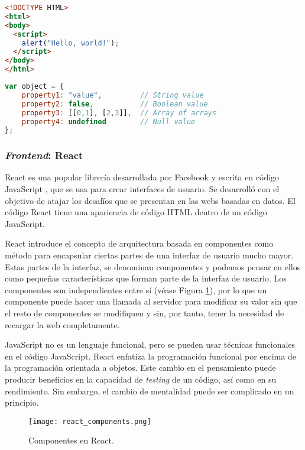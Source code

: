 \begin{lstlisting}[language=html,captionpos=t,caption={\textbf{\textit{Hello world} en JavaScript.}},label={lst:jsHelloWorld}]
<!DOCTYPE HTML>
<html>
<body>
  <script>
    alert("Hello, world!");
  </script>
</body>
</html>
\end{lstlisting}


\begin{lstlisting}[language=JavaScript,captionpos=t,caption={\textbf{Creación de un objeto en JavaScript.}},label={lst:jsObjects}]
var object = {
	property1: "value",         // String value
	property2: false,           // Boolean value
	property3: [[0,1], [2,3]],  // Array of arrays
	property4: undefined        // Null value
};
\end{lstlisting}

\subsubsection{\textit{Frontend}: React}

React es una popular librería desarrollada por Facebook y escrita en código JavaScript \cite{36}, que se usa para crear interfaces de usuario. Se desarrolló con el objetivo de atajar los desafíos que se presentan en las webs basadas en datos. El código React tiene una apariencia de código \ac{HTML} dentro de un código JavaScript. 

React introduce el concepto de arquitectura basada en componentes como método para encapsular ciertas partes de una interfaz de usuario mucho mayor. Estas partes de la interfaz, se denominan componentes y podemos pensar en ellos como pequeñas características que forman parte de la interfaz de usuario. Los componentes son independientes entre sí (véase Figura \ref{fig:reactComponents}), por lo que un componente puede hacer una llamada al servidor para modificar su valor sin que el resto de componentes se modifiquen y sin, por tanto, tener la necesidad de recargar la web completamente. 

JavaScript no es un lenguaje funcional, pero se pueden usar técnicas funcionales en el código JavaScript. React enfatiza la programación funcional por encima de la programación orientada a objetos. Este cambio en el pensamiento puede producir beneficios en la capacidad de \textit{testing} de un código, así como en su rendimiento. Sin embargo, el cambio de mentalidad puede ser complicado en un principio.

\begin{figure}[!h]
\begin{center}
\texttt{[image: react\_components.png]}
\caption{Componentes en React.}
\label{fig:reactComponents}
\end{center}
\end{figure}

